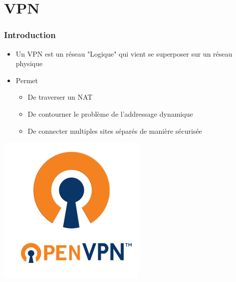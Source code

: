 
\section{VPN}

\begin{frame}
\frametitle{Introduction}

\begin{itemize}
    \item Un VPN est un réseau "Logique" qui vient se superposer sur un réseau physique
    \item Permet
    \begin{itemize}
        \item De traverser un NAT
        \item De contourner le problème de l'addressage dynamique
        \item De connecter multiples sites séparés de manière sécurisée
    \end{itemize}
\end{itemize}
\begin{center}
\includegraphics[scale=0.24]{res/openvpn}
\end{center}

\end{frame}

